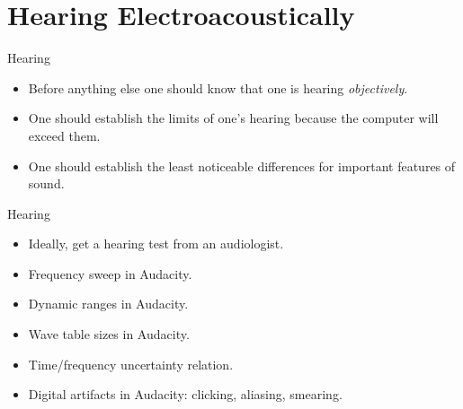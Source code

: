\documentclass{beamer}
\begin{document}
    \section{Hearing Electroacoustically}
       \begin{frame}{Hearing}
    	\begin{itemize}
	  \item Before anything else one should know that one is hearing \textit{objectively}.
	  \item One should establish the limits of one's hearing because the computer 
	  will exceed them.
	  \item One should establish the least noticeable differences for important features of sound. 
	\end{itemize}
    \end{frame}
\begin{frame}
	\begin{example}{Hearing}
		\begin{itemize}
			\item Ideally, get a hearing test from an audiologist.
			\item Frequency sweep in Audacity.
			\item Dynamic ranges in Audacity.
			\item Wave table sizes in Audacity.
			\item Time/frequency uncertainty relation.
			\item Digital artifacts in Audacity: clicking, aliasing, smearing.
		\end{itemize}
 	\end{example}
 \end{frame}
\end{document}

